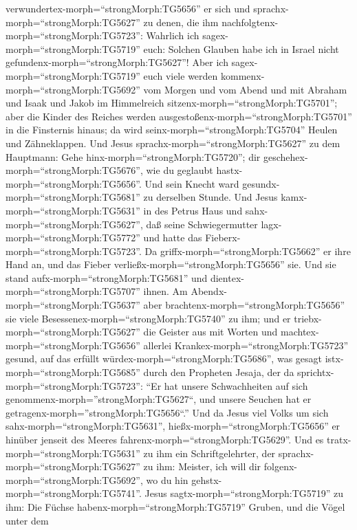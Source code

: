 verwundertex-morph=``strongMorph:TG5656'' er sich und
sprachx-morph=``strongMorph:TG5627'' zu denen, die ihm
nachfolgtenx-morph=``strongMorph:TG5723'': Wahrlich ich
sagex-morph=``strongMorph:TG5719'' euch: Solchen Glauben habe ich in
Israel nicht gefundenx-morph=``strongMorph:TG5627''!  Aber
ich sagex-morph=``strongMorph:TG5719'' euch viele werden
kommenx-morph=``strongMorph:TG5692'' vom Morgen und vom Abend und mit
Abraham und Isaak und Jakob im Himmelreich
sitzenx-morph=``strongMorph:TG5701'';  aber die Kinder des
Reiches werden ausgestoßenx-morph=``strongMorph:TG5701'' in die
Finsternis hinaus; da wird seinx-morph=``strongMorph:TG5704'' Heulen und
Zähneklappen.  Und Jesus
sprachx-morph=``strongMorph:TG5627'' zu dem Hauptmann: Gehe
hinx-morph=``strongMorph:TG5720''; dir
geschehex-morph=``strongMorph:TG5676'', wie du geglaubt
hastx-morph=``strongMorph:TG5656''. Und sein Knecht ward
gesundx-morph=``strongMorph:TG5681'' zu derselben Stunde. 
Und Jesus kamx-morph=``strongMorph:TG5631'' in des Petrus Haus und
sahx-morph=``strongMorph:TG5627'', daß seine Schwiegermutter
lagx-morph=``strongMorph:TG5772'' und hatte das
Fieberx-morph=``strongMorph:TG5723''.  Da
griffx-morph=``strongMorph:TG5662'' er ihre Hand an, und das Fieber
verließx-morph=``strongMorph:TG5656'' sie. Und sie stand
aufx-morph=``strongMorph:TG5681'' und
dientex-morph=``strongMorph:TG5707'' ihnen.  Am
Abendx-morph=``strongMorph:TG5637'' aber
brachtenx-morph=``strongMorph:TG5656'' sie viele
Besessenex-morph=``strongMorph:TG5740'' zu ihm; und er
triebx-morph=``strongMorph:TG5627'' die Geister aus mit Worten und
machtex-morph=``strongMorph:TG5656'' allerlei
Krankex-morph=``strongMorph:TG5723'' gesund,  auf das
erfüllt würdex-morph=``strongMorph:TG5686'', was gesagt
istx-morph=``strongMorph:TG5685'' durch den Propheten Jesaja, der da
sprichtx-morph=``strongMorph:TG5723'': ``Er hat unsere Schwachheiten auf
sich genommenx-morph=''strongMorph:TG5627``, und unsere Seuchen hat er
getragenx-morph=''strongMorph:TG5656``.''  Und da Jesus
viel Volks um sich sahx-morph=``strongMorph:TG5631'',
hießx-morph=``strongMorph:TG5656'' er hinüber jenseit des Meeres
fahrenx-morph=``strongMorph:TG5629''.  Und es
tratx-morph=``strongMorph:TG5631'' zu ihm ein Schriftgelehrter, der
sprachx-morph=``strongMorph:TG5627'' zu ihm: Meister, ich will dir
folgenx-morph=``strongMorph:TG5692'', wo du hin
gehstx-morph=``strongMorph:TG5741''.  Jesus
sagtx-morph=``strongMorph:TG5719'' zu ihm: Die Füchse
habenx-morph=``strongMorph:TG5719'' Gruben, und die Vögel unter dem
